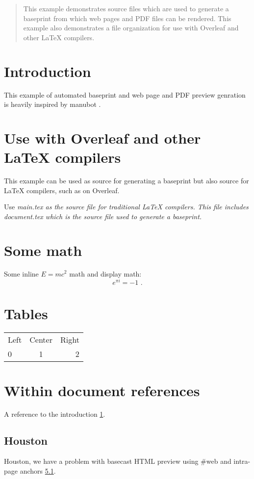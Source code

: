 

\newcommand{\mathstop}{\text{\ .}}



\begin{abstract}
This example demonstrates source files which are used to generate a baseprint from which
web pages and PDF files can be rendered.
This example also demonstrates a file organization for use with Overleaf and other LaTeX
compilers.
\end{abstract}

\section{Introduction}

\label{intro}

This example of automated baseprint and web page and PDF preview genration is heavily
inspired by manubot \cite{himmelstein_open_2019}.

\section{Use with Overleaf and other LaTeX compilers}

This example can be used as source for generating a baseprint but also source for
LaTeX compilers, such as on Overleaf.

Use \it{main.tex} as the source file for traditional LaTeX compilers.
This file includes \it{document.tex} which is the source file used to generate a
baseprint.

\section{Some math}

Some inline $E = mc^2$ math and display math:
\[
e^{\pi i} = -1
\mathstop
\]

\section{Tables}

\begin{tabular}{l c r}
 Left & Center & Right \\
  0   &    1   &   2
\end{tabular}

\section{Within document references}

A reference to the introduction \ref{intro}.

\subsection{Houston}

\label{web}

Houston, we have a problem with basecast HTML preview using #web and intra-page anchors
\ref{web}.


\printbibliography %

